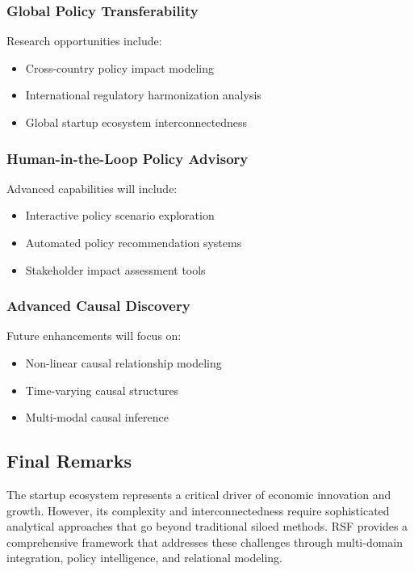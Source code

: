 \subsubsection{Global Policy Transferability}
Research opportunities include:
\begin{itemize}
    \item Cross-country policy impact modeling
    \item International regulatory harmonization analysis
    \item Global startup ecosystem interconnectedness
\end{itemize}

\subsubsection{Human-in-the-Loop Policy Advisory}
Advanced capabilities will include:
\begin{itemize}
    \item Interactive policy scenario exploration
    \item Automated policy recommendation systems
    \item Stakeholder impact assessment tools
\end{itemize}

\subsubsection{Advanced Causal Discovery}
Future enhancements will focus on:
\begin{itemize}
    \item Non-linear causal relationship modeling
    \item Time-varying causal structures
    \item Multi-modal causal inference
\end{itemize}

\subsection{Final Remarks}

The startup ecosystem represents a critical driver of economic innovation and growth. However, its complexity and interconnectedness require sophisticated analytical approaches that go beyond traditional siloed methods. RSF provides a comprehensive framework that addresses these challenges through multi-domain integration, policy intelligence, and relational modeling.

